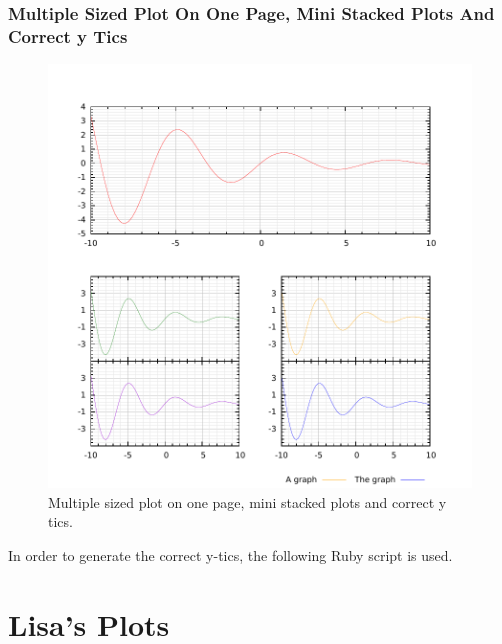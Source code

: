 \documentclass[10pt,a4paper,final]{report}
\begin{document}
\section{Multiple Sized Plot On One Page, Mini Stacked Plots And Correct y Tics} \label{sec:MultipleSizedPlots}
\begin{figure}[!hbtp]
\centering
\includegraphics[width=\textwidth]{../CodeJeanLuc/MultipleSizedPlots/MultipleSizedPlots.pdf}
\caption{Multiple sized plot on one page, mini stacked plots and correct y tics.}
\end{figure}

In order to generate the correct y-tics, the following Ruby script is used.




\part*{Lisa's Plots}
\setcounter{section}{0}
\end{document}

